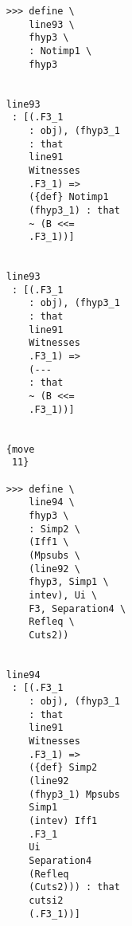 \documentclass[12pt]{article}
\begin{document}
\begin{verbatim}
                                    >>> define \
                                        line93 \
                                        fhyp3 \
                                        : Notimp1 \
                                        fhyp3


                                    line93 
                                     : [(.F3_1 
                                        : obj), (fhyp3_1 
                                        : that 
                                        line91 
                                        Witnesses 
                                        .F3_1) => 
                                        ({def} Notimp1 
                                        (fhyp3_1) : that 
                                        ~ (B <<= 
                                        .F3_1))]


                                    line93 
                                     : [(.F3_1 
                                        : obj), (fhyp3_1 
                                        : that 
                                        line91 
                                        Witnesses 
                                        .F3_1) => 
                                        (--- 
                                        : that 
                                        ~ (B <<= 
                                        .F3_1))]


                                    {move 
                                     11}

                                    >>> define \
                                        line94 \
                                        fhyp3 \
                                        : Simp2 \
                                        (Iff1 \
                                        (Mpsubs \
                                        (line92 \
                                        fhyp3, Simp1 \
                                        intev), Ui \
                                        F3, Separation4 \
                                        Refleq \
                                        Cuts2))


                                    line94 
                                     : [(.F3_1 
                                        : obj), (fhyp3_1 
                                        : that 
                                        line91 
                                        Witnesses 
                                        .F3_1) => 
                                        ({def} Simp2 
                                        (line92 
                                        (fhyp3_1) Mpsubs 
                                        Simp1 
                                        (intev) Iff1 
                                        .F3_1 
                                        Ui 
                                        Separation4 
                                        (Refleq 
                                        (Cuts2))) : that 
                                        cutsi2 
                                        (.F3_1))]



\end{verbatim}
\end{document}
